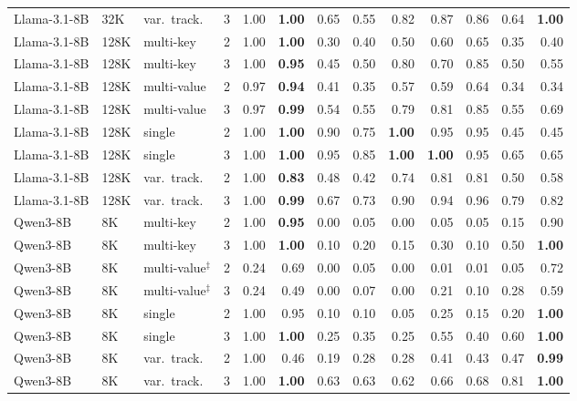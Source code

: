 \begin{tabular}{@{}llllrrrrrrrrr@{}}
Llama-3.1-8B & 32K & var.\ track. & 3 & 1.00 & \textbf{1.00} & 0.65 & 0.55 & 0.82 & 0.87 & 0.86 & 0.64 & \textbf{1.00} \\
\addlinespace[1pt]
Llama-3.1-8B & 128K & multi-key & 2 & 1.00 & \textbf{1.00} & 0.30 & 0.40 & 0.50 & 0.60 & 0.65 & 0.35 & 0.40 \\
Llama-3.1-8B & 128K & multi-key & 3 & 1.00 & \textbf{0.95} & 0.45 & 0.50 & 0.80 & 0.70 & 0.85 & 0.50 & 0.55 \\
Llama-3.1-8B & 128K & multi-value & 2 & 0.97 & \textbf{0.94} & 0.41 & 0.35 & 0.57 & 0.59 & 0.64 & 0.34 & 0.34 \\
Llama-3.1-8B & 128K & multi-value & 3 & 0.97 & \textbf{0.99} & 0.54 & 0.55 & 0.79 & 0.81 & 0.85 & 0.55 & 0.69 \\
Llama-3.1-8B & 128K & single & 2 & 1.00 & \textbf{1.00} & 0.90 & 0.75 & \textbf{1.00} & 0.95 & 0.95 & 0.45 & 0.45 \\
Llama-3.1-8B & 128K & single & 3 & 1.00 & \textbf{1.00} & 0.95 & 0.85 & \textbf{1.00} & \textbf{1.00} & 0.95 & 0.65 & 0.65 \\
Llama-3.1-8B & 128K & var.\ track. & 2 & 1.00 & \textbf{0.83} & 0.48 & 0.42 & 0.74 & 0.81 & 0.81 & 0.50 & 0.58 \\
Llama-3.1-8B & 128K & var.\ track. & 3 & 1.00 & \textbf{0.99} & 0.67 & 0.73 & 0.90 & 0.94 & 0.96 & 0.79 & 0.82 \\
\addlinespace[1pt]
Qwen3-8B & 8K & multi-key & 2 & 1.00 & \textbf{0.95} & 0.00 & 0.05 & 0.00 & 0.05 & 0.05 & 0.15 & 0.90 \\
Qwen3-8B & 8K & multi-key & 3 & 1.00 & \textbf{1.00} & 0.10 & 0.20 & 0.15 & 0.30 & 0.10 & 0.50 & \textbf{1.00} \\
Qwen3-8B & 8K & multi-value$^\ddagger$ & 2 & 0.24 & 0.69 & 0.00 & 0.05 & 0.00 & 0.01 & 0.01 & 0.05 & 0.72 \\
Qwen3-8B & 8K & multi-value$^\ddagger$ & 3 & 0.24 & 0.49 & 0.00 & 0.07 & 0.00 & 0.21 & 0.10 & 0.28 & 0.59 \\
Qwen3-8B & 8K & single & 2 & 1.00 & 0.95 & 0.10 & 0.10 & 0.05 & 0.25 & 0.15 & 0.20 & \textbf{1.00} \\
Qwen3-8B & 8K & single & 3 & 1.00 & \textbf{1.00} & 0.25 & 0.35 & 0.25 & 0.55 & 0.40 & 0.60 & \textbf{1.00} \\
Qwen3-8B & 8K & var.\ track. & 2 & 1.00 & 0.46 & 0.19 & 0.28 & 0.28 & 0.41 & 0.43 & 0.47 & \textbf{0.99} \\
Qwen3-8B & 8K & var.\ track. & 3 & 1.00 & \textbf{1.00} & 0.63 & 0.63 & 0.62 & 0.66 & 0.68 & 0.81 & \textbf{1.00} \\

\end{tabular}
